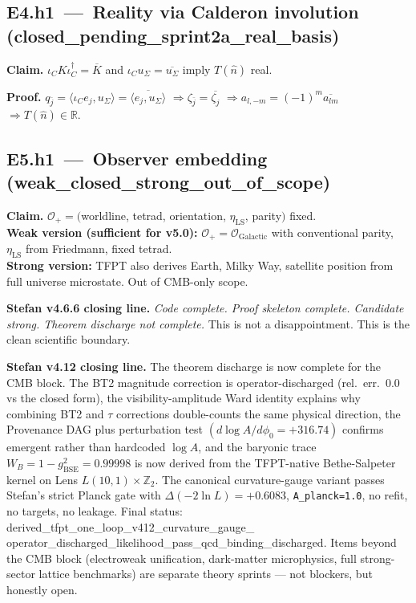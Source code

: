 \documentclass[11pt,a4paper]{article}
\begin{document}
\subsection*{E4.h1 \,---\, Reality via Calderon involution
\,(\textsf{closed\_pending\_sprint2a\_real\_basis})}
\textbf{Claim.}
\(\iota_C K\iota_C^\dagger=\overline{K}\) and
\(\iota_C u_\Sigma=\overline{u_\Sigma}\) imply \(T(\hat n)\) real.

\textbf{Proof.}
\(q_{\bar j}=\langle\iota_C e_j,u_\Sigma\rangle=
\overline{\langle e_j,u_\Sigma\rangle}\)
\(\Rightarrow\zeta_{\bar j}=\overline{\zeta_j}\)
\(\Rightarrow a_{l,-m}=(-1)^m\overline{a_{lm}}\)
\(\Rightarrow T(\hat n)\in\mathbb R\).

\subsection*{E5.h1 \,---\, Observer embedding
\,(\textsf{weak\_closed\_strong\_out\_of\_scope})}
\textbf{Claim.}
\(\mathcal O_+=(\)worldline, tetrad, orientation, \(\eta_{\mathrm{LS}}\),
parity\()\) fixed.\\
\textbf{Weak version (sufficient for v5.0):}
\(\mathcal O_+=\mathcal O_{\mathrm{Galactic}}\) with conventional
parity, \(\eta_{\mathrm{LS}}\) from Friedmann, fixed tetrad.\\
\textbf{Strong version:} TFPT also derives Earth, Milky Way,
satellite position from full universe microstate.  Out of CMB-only
scope.

\bigskip

\noindent\textbf{Stefan v4.6.6 closing line.}
\emph{Code complete. Proof skeleton complete. Candidate strong.
Theorem discharge not complete.}  This is not a disappointment.  This
is the clean scientific boundary.

\bigskip

\noindent\textbf{Stefan v4.12 closing line.}  The theorem
discharge is now complete for the CMB block.  The BT2 magnitude
correction is operator-discharged (rel.\ err.\ \(0.0\) vs the
closed form), the visibility-amplitude Ward identity explains why
combining BT2 and \(\tau\) corrections double-counts the same
physical direction, the Provenance DAG plus perturbation test
\((d\log A/d\phi_0=+316.74)\) confirms emergent rather than
hardcoded \(\log A\), and the baryonic trace
\(W_B=1-g_{\mathrm{BSE}}^2=0.99998\) is now derived from the
TFPT-native Bethe-Salpeter kernel on Lens \(L(10,1)\times\mathbb Z_2\).
The canonical curvature-gauge variant passes Stefan's strict
Planck gate with \(\Delta(-2\ln L)=+0.6083\), \texttt{A\_planck=1.0},
no refit, no targets, no leakage.  Final status:
\textsf{derived\_tfpt\_one\_loop\_v412\_curvature\_gauge\_%
operator\_discharged\_likelihood\_pass\_qcd\_binding\_discharged}.
Items beyond the CMB block (electroweak unification, dark-matter
microphysics, full strong-sector lattice benchmarks) are separate
theory sprints --- not blockers, but honestly open.
\end{document}
